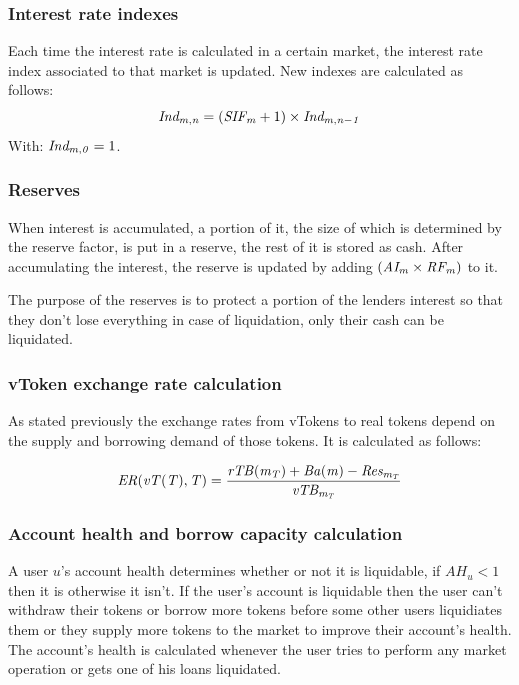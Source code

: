 \subsubsection{Interest rate indexes}

Each time the interest rate is calculated in a certain market, the interest rate index associated to that market is updated. New indexes are calculated as follows:
$$
\mathit{Ind_{m, n}} = (\mathit{SIF_{m}} + 1) \times\mathit{Ind_{m, n-1}}
$$
With: $\mathit{Ind_{m, 0}} = 1$.

\subsubsection{Reserves}

When interest is accumulated, a portion of it, the size of which is determined by the reserve factor, is put in a reserve, the rest of it is stored as cash. After accumulating the interest, the reserve is updated by adding $(\mathit{AI_{m}} \times \mathit{RF_{m}})$ to it.

The purpose of the reserves is to protect a portion of the lenders interest so that they don't lose everything in case of liquidation, only their cash can be liquidated. %

\subsubsection{vToken exchange rate calculation}

As stated previously the exchange rates from vTokens to real tokens depend on the supply and borrowing demand of those tokens. It is calculated as follows:

$$
  \mathit{ER(\mathit{vT(T)}, T)} = \frac{\mathit{rTB(\mathit{m_{T}})} + \mathit{Ba(m)} - \mathit{Res_{\mathit{m_{T}}}}}{\mathit{vTB_{\mathit{m_{T}}}}}
$$

\subsubsection{Account health and borrow capacity calculation}

A user $u$'s account health determines whether or not it is liquidable, if $AH_u < 1$ then it is otherwise it isn't. If the user's account is liquidable then the user can't withdraw their tokens or borrow more tokens before some other users liquidiates them or they supply more tokens to the market to improve their account's health. The account's health is calculated whenever the user tries to perform any market operation or gets one of his loans liquidated.

